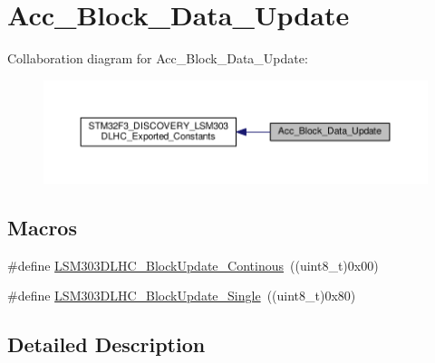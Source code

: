 \hypertarget{group__Acc__Block__Data__Update}{\section{Acc\+\_\+\+Block\+\_\+\+Data\+\_\+\+Update}
\label{group__Acc__Block__Data__Update}
}
Collaboration diagram for Acc\+\_\+\+Block\+\_\+\+Data\+\_\+\+Update\+:\nopagebreak
\begin{figure}[H]
\begin{center}
\leavevmode
\includegraphics[width=350pt]{group__Acc__Block__Data__Update}
\end{center}
\end{figure}
\subsection*{Macros}
\begin{DoxyCompactItemize}
\item 
\#define \hyperlink{group__Acc__Block__Data__Update_ga475b67ab49339eabab2d1e317a1cd439}{L\+S\+M303\+D\+L\+H\+C\+\_\+\+Block\+Update\+\_\+\+Continous}~((uint8\+\_\+t)0x00)
\item 
\#define \hyperlink{group__Acc__Block__Data__Update_gaac053cfddd26dede2fb898e357c5c0aa}{L\+S\+M303\+D\+L\+H\+C\+\_\+\+Block\+Update\+\_\+\+Single}~((uint8\+\_\+t)0x80)
\end{DoxyCompactItemize}


\subsection{Detailed Description}


